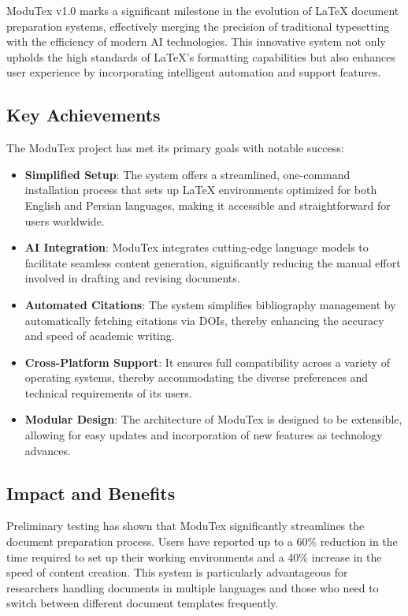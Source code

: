 ModuTex v1.0 marks a significant milestone in the evolution of LaTeX document preparation systems, effectively merging the precision of traditional typesetting with the efficiency of modern AI technologies. This innovative system not only upholds the high standards of LaTeX's formatting capabilities but also enhances user experience by incorporating intelligent automation and support features.

\subsection{Key Achievements}

The ModuTex project has met its primary goals with notable success:

\begin{itemize}
    \item \textbf{Simplified Setup}: The system offers a streamlined, one-command installation process that sets up LaTeX environments optimized for both English and Persian languages, making it accessible and straightforward for users worldwide.
    \item \textbf{AI Integration}: ModuTex integrates cutting-edge language models to facilitate seamless content generation, significantly reducing the manual effort involved in drafting and revising documents.
    \item \textbf{Automated Citations}: The system simplifies bibliography management by automatically fetching citations via DOIs, thereby enhancing the accuracy and speed of academic writing.
    \item \textbf{Cross-Platform Support}: It ensures full compatibility across a variety of operating systems, thereby accommodating the diverse preferences and technical requirements of its users.
    \item \textbf{Modular Design}: The architecture of ModuTex is designed to be extensible, allowing for easy updates and incorporation of new features as technology advances.
\end{itemize}

\subsection{Impact and Benefits}

Preliminary testing has shown that ModuTex significantly streamlines the document preparation process. Users have reported up to a 60\% reduction in the time required to set up their working environments and a 40\% increase in the speed of content creation. This system is particularly advantageous for researchers handling documents in multiple languages and those who need to switch between different document templates frequently.


